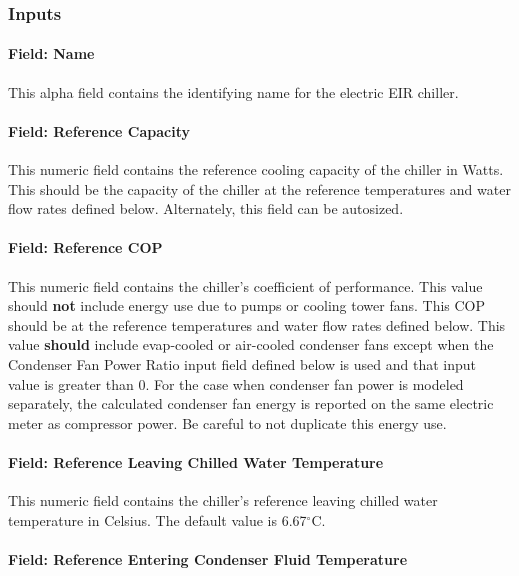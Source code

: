 \subsubsection{Inputs}\label{inputs-4-023}

\paragraph{Field: Name}\label{field-name-4-020}

This alpha field contains the identifying name for the electric EIR chiller.

\paragraph{Field: Reference Capacity}\label{field-reference-capacity}

This numeric field contains the reference cooling capacity of the chiller in Watts. This should be the capacity of the chiller at the reference temperatures and water flow rates defined below. Alternately, this field can be autosized.

\paragraph{Field: Reference COP}\label{field-reference-cop}

This numeric field contains the chiller's coefficient of performance. This value should \textbf{not} include energy use due to pumps or cooling tower fans. This COP should be at the reference temperatures and water flow rates defined below. This value \textbf{should} include evap-cooled or air-cooled condenser fans except when the Condenser Fan Power Ratio input field defined below is used and that input value is greater than 0. For the case when condenser fan power is modeled separately, the calculated condenser fan energy is reported on the same electric meter as compressor power. Be careful to not duplicate this energy use.

\paragraph{Field: Reference Leaving Chilled Water Temperature}\label{field-reference-leaving-chilled-water-temperature}

This numeric field contains the chiller's reference leaving chilled water temperature in Celsius. The default value is 6.67$^\circ$C.

\paragraph{Field: Reference Entering Condenser Fluid Temperature}\label{field-reference-entering-condenser-fluid-temperature}


